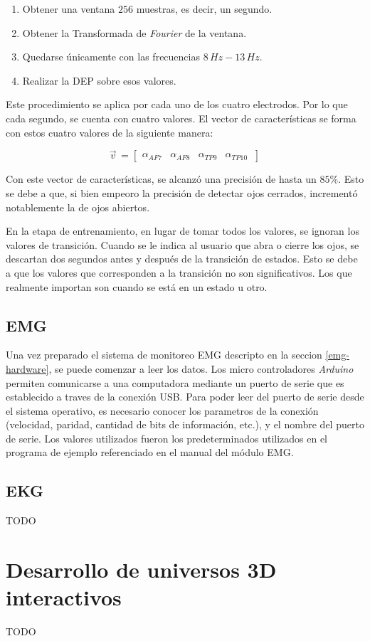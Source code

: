  \begin{enumerate}
 \item Obtener una ventana $256$ muestras, es decir, un segundo.
 \item Obtener la Transformada de \emph{Fourier} de la ventana.
 \item Quedarse únicamente con las frecuencias $8 \, Hz-13 \, Hz$.
 \item Realizar la DEP sobre esos valores.
 \end{enumerate}
 
Este procedimiento se aplica por cada uno de los cuatro electrodos. Por lo que cada segundo, se cuenta con cuatro valores. El vector de características se forma con estos cuatro valores de la siguiente manera:
 
\[
  \vec{v}^{\, }=
  \left[ {\begin{array}{cccc}
   \alpha_{AF7}  & \alpha_{AF8} & \alpha_{TP9} & \alpha_{TP10}  \     \end{array} } \right]
\] 

Con este vector de características, se alcanzó una precisión de hasta un $ 85 \%$. Esto se debe a que, si bien empeoro la precisión de detectar ojos cerrados, incrementó notablemente la de ojos abiertos.
 
En la etapa de entrenamiento, en lugar de tomar todos los valores, se ignoran los valores de transición. Cuando se le indica al usuario que abra o cierre los ojos, se descartan dos segundos antes y después de la transición de estados. Esto se debe a que los valores que corresponden a la transición no son significativos. Los que realmente importan son cuando se está en un estado u otro.
 
\subsection{EMG}

Una vez preparado el sistema de monitoreo EMG descripto en la seccion \ref{emg-hardware}, se puede comenzar a leer los datos. Los micro controladores \emph{Arduino} permiten comunicarse a una computadora mediante un puerto de serie que es establecido a traves de la conexión USB.  Para poder leer del puerto de serie desde el sistema operativo, es necesario conocer los parametros de la conexión (velocidad, paridad, cantidad de bits de información, etc.), y el nombre del puerto de serie. Los valores utilizados fueron los predeterminados utilizados en el programa de ejemplo referenciado en el manual del módulo EMG\cite{olimex-manual}.

\subsection{EKG}

TODO

\section{Desarrollo de universos 3D interactivos}

TODO